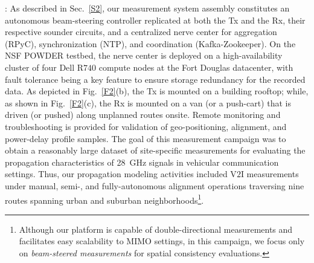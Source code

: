 \documentclass[10pt, twocolumn]{IEEEtran}
\begin{document}
: As described in Sec.~\ref{S2}, our measurement system assembly constitutes an autonomous beam-steering controller replicated at both the Tx and the Rx, their respective sounder circuits, and a centralized nerve center for aggregation (RPyC), synchronization (NTP), and coordination (Kafka-Zookeeper). On the NSF POWDER testbed, the nerve center is deployed on a high-availability cluster of four Dell R$740$ compute nodes at the Fort Douglas datacenter, with fault tolerance being a key feature to ensure storage redundancy for the recorded data. As depicted in Fig.~\ref{F2}(b), the Tx is mounted on a building rooftop; while, as shown in Fig.~\ref{F2}(c), the Rx is mounted on a van (or a push-cart) that is driven (or pushed) along unplanned routes onsite. Remote monitoring and troubleshooting is provided for validation of geo-positioning, alignment, and power-delay profile samples. The goal of this measurement campaign was to obtain a reasonably large dataset of site-specific measurements for evaluating the propagation characteristics of \SI{28}{\giga\hertz} signals in vehicular communication settings. Thus, our propagation modeling activities included V$2$I measurements under manual, semi-, and fully-autonomous alignment operations traversing nine routes spanning urban and suburban neighborhoods\footnote{Although our platform is capable of double-directional measurements and facilitates easy scalability to MIMO settings, in this campaign, we focus only on \emph{beam-steered measurements} for spatial consistency evaluations.}.
\end{document}
